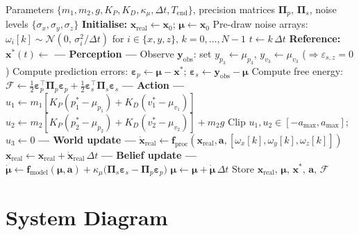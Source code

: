 \documentclass[11pt, a4paper]{article}
\newcommand{\vect}[1]{\bm{#1}}
\newcommand{\mat}[1]{\mathbf{#1}}
\newcommand{\FE}{\mathcal{F}}
\newcommand{\Pip}{\mat{\Pi}_p}
\newcommand{\Pis}{\mat{\Pi}_s}
\newcommand{\epsp}{\vect{\varepsilon}_p}
\newcommand{\epss}{\vect{\varepsilon}_s}
\begin{document}
\begin{algorithm}[H]
\caption{Continuous Active Inference --- 3-D Trajectory Tracking}
\label{alg:aif}
\begin{algorithmic}[1]
\Require Parameters $\{m_1, m_2, g, K_P, K_D, \kappa_\mu, \Delta t, T_{\text{end}}\}$,
         precision matrices $\Pip$, $\Pis$,
         noise levels $\{\sigma_x, \sigma_y, \sigma_z\}$
\State \textbf{Initialise:} $\vect{x}_{\text{real}} \leftarrow \vect{x}_0$;\quad
       $\vect{\mu} \leftarrow \vect{x}_0$
\State Pre-draw noise arrays:
       $\omega_i[k] \sim \mathcal{N}(0,\,\sigma_i^2/\Delta t)$
       for $i \in \{x,y,z\}$, $k = 0,\ldots,N-1$
  \State $t \leftarrow k\,\Delta t$
  \State \textbf{Reference:} $\vect{x}^*(t) \leftarrow$ 
  \State
  \State \textbf{--- Perception ---}
  \State Observe $\vect{y}_{\text{obs}}$: set $y_{p_3} \leftarrow \mu_{p_3}$,
         $y_{v_3} \leftarrow \mu_{v_3}$
         \quad($\Rightarrow \varepsilon_{s,z} = 0$)
  \State Compute prediction errors:
         $\epsp \leftarrow \vect{\mu} - \vect{x}^*$;\quad
         $\epss \leftarrow \vect{y}_{\text{obs}} - \vect{\mu}$
  \State Compute free energy:
         $\FE \leftarrow \tfrac12 \epsp^\top\!\Pip\epsp + \tfrac12 \epss^\top\!\Pis\epss$
  \State
  \State \textbf{--- Action ---}
  \State $u_1 \leftarrow m_1[K_P(p_1^* - \mu_{p_1}) + K_D(v_1^* - \mu_{v_1})]$
  \State $u_2 \leftarrow m_2[K_P(p_2^* - \mu_{p_2}) + K_D(v_2^* - \mu_{v_2})] + m_2 g$
  \State Clip $u_1, u_2 \in [-a_{\max}, a_{\max}]$;\quad $u_3 \leftarrow 0$
  \State
  \State \textbf{--- World update ---}
  \State $\dot{\vect{x}}_{\text{real}} \leftarrow
         \vect{f}_{\text{proc}}(\vect{x}_{\text{real}}, \vect{a},
                                [\omega_x[k],\omega_y[k],\omega_z[k]])$
  \State $\vect{x}_{\text{real}} \leftarrow \vect{x}_{\text{real}} + \dot{\vect{x}}_{\text{real}}\,\Delta t$
  \State
  \State \textbf{--- Belief update ---}
  \State $\dot{\vect{\mu}} \leftarrow
         \vect{f}_{\text{model}}(\vect{\mu}, \vect{a})
         + \kappa_\mu\bigl(\Pis\epss - \Pip\epsp\bigr)$
  \State $\vect{\mu} \leftarrow \vect{\mu} + \dot{\vect{\mu}}\,\Delta t$
  \State
  \State Store $\vect{x}_{\text{real}},\,\vect{\mu},\,\vect{x}^*,\,\vect{a},\,\FE$
\EndFor
\end{algorithmic}
\end{algorithm}

\section{System Diagram}
\end{document}
